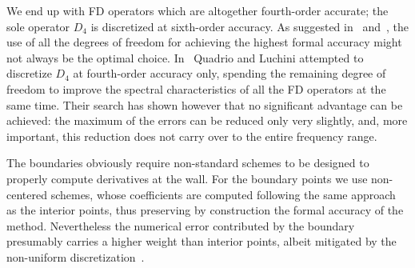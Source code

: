 We end up with FD operators which are altogether fourth-order accurate; the sole operator $D_{4}$ is discretized at sixth-order accuracy. As suggested in~\cite{kim_moin_moser} and~\cite{compact:difference}, the use of all the degrees of freedom for achieving the highest formal accuracy might not always be the optimal choice. In~\cite{ns:quadrio} Quadrio and Luchini attempted to discretize $D_{4}$ at fourth-order accuracy only, spending the remaining degree of freedom to improve the spectral characteristics of all the FD operators at the same time. Their search has shown however that no significant advantage can be achieved: the maximum of the errors can be reduced only very slightly, and, more important, this reduction does not carry over to the entire frequency range.\par
The boundaries obviously require non-standard schemes to be designed to properly compute derivatives at the wall. For the boundary points we use non-centered schemes, whose coefficients are computed following the same approach as the interior points, thus preserving by construction the formal accuracy of the method. Nevertheless the numerical error contributed by the boundary presumably carries a higher weight than interior points, albeit mitigated by the non-uniform discretization~\cite{ns:quadrio}. 
